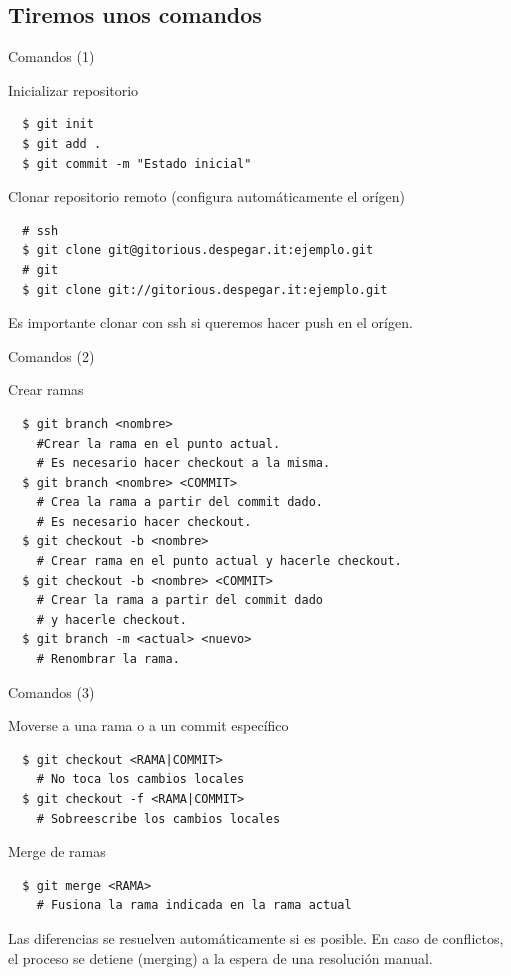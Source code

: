 \documentclass{beamer}
\begin{document}
\subsection{Tiremos unos comandos}

\begin{frame}[fragile]{Comandos (1)}
  \begin{block}{Inicializar repositorio}
    \begin{verbatim}
  $ git init
  $ git add .
  $ git commit -m "Estado inicial"
    \end{verbatim}
  \end{block}
  
  \begin{block}{Clonar repositorio remoto (configura automáticamente el orígen)}
    \begin{verbatim}
  # ssh
  $ git clone git@gitorious.despegar.it:ejemplo.git
  # git
  $ git clone git://gitorious.despegar.it:ejemplo.git
    \end{verbatim}
    Es importante clonar con ssh si queremos hacer push en el orígen.
  \end{block}
  
\end{frame}

\begin{frame}[fragile]{Comandos (2)}
  \begin{block}{Crear ramas}
    \begin{verbatim}
  $ git branch <nombre> 
    #Crear la rama en el punto actual.                 
    # Es necesario hacer checkout a la misma.
  $ git branch <nombre> <COMMIT>    
    # Crea la rama a partir del commit dado. 
    # Es necesario hacer checkout.
  $ git checkout -b <nombre>  
    # Crear rama en el punto actual y hacerle checkout.
  $ git checkout -b <nombre> <COMMIT>   
    # Crear la rama a partir del commit dado 
    # y hacerle checkout.
  $ git branch -m <actual> <nuevo>  
    # Renombrar la rama.
    \end{verbatim}
  \end{block}
\end{frame}

\begin{frame}[fragile]{Comandos (3)}
  \begin{block}{Moverse a una rama o a un commit específico}
    \begin{verbatim}
  $ git checkout <RAMA|COMMIT>
    # No toca los cambios locales
  $ git checkout -f <RAMA|COMMIT>
    # Sobreescribe los cambios locales
    \end{verbatim}
  \end{block} \pause
  
  \begin{block}{Merge de ramas}
    \begin{verbatim}
  $ git merge <RAMA>
    # Fusiona la rama indicada en la rama actual
    \end{verbatim}    
    Las diferencias se resuelven automáticamente si es posible. En caso de conflictos,
    el proceso se detiene (merging) a la espera de una resolución manual.
  \end{block}
\end{frame}
\end{document}
